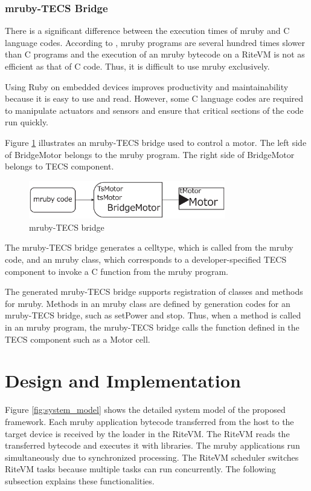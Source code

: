 \documentclass{sig-alternate-05-2015}
\begin{document}
\subsubsection{mruby-TECS Bridge}
There is a significant difference between the execution times of mruby and C language codes.
According to  \cite{par:mrubyonTECS}, mruby programs are several hundred times slower than C programs and the execution of an mruby bytecode on a RiteVM is not as efficient as that of C code.
Thus, it is difficult to use mruby exclusively.

Using Ruby on embedded devices improves productivity and maintainability because it is easy to use and read.
However, some C language codes are required to manipulate actuators and sensors and ensure that critical sections of the code run quickly.

Figure \ref{fig:mruby_TECS_bridge} illustrates an mruby-TECS bridge used to control a motor.
The left side of BridgeMotor belongs to the mruby program.
The right side of BridgeMotor belongs to TECS component.
\begin{figure}[t]
    \centering
    \includegraphics[width=8.6cm,clip]{figure/mruby_TECS_bridge.eps}
    \vspace{0.5mm}
\caption{mruby-TECS bridge}
    \vspace{1mm}
\label{fig:mruby_TECS_bridge}
\end{figure}

The mruby-TECS bridge generates a {\myit celltype}, which is called from the mruby code, and an mruby class, which corresponds to a developer-specified TECS component to invoke a C function from the mruby program.

The generated mruby-TECS bridge supports registration of classes and methods for mruby.
Methods in an mruby class are defined by generation codes for an mruby-TECS bridge, such as setPower and stop.
Thus, when a method is called in an mruby program, the mruby-TECS bridge calls the function defined in the TECS component such as a Motor {\myit cell}.

\section{Design and Implementation}
\label{sec:Design and Implementation}
Figure \ref{fig:system_model} shows the detailed system model of the proposed framework.
Each mruby application bytecode transferred from the host to the target device is received by the loader in the RiteVM.
The RiteVM reads the transferred bytecode and executes it with libraries.
The mruby applications run simultaneously due to synchronized processing.
The RiteVM scheduler switches RiteVM tasks because multiple tasks can run concurrently.
The following subsection explains these functionalities.
\end{document}

